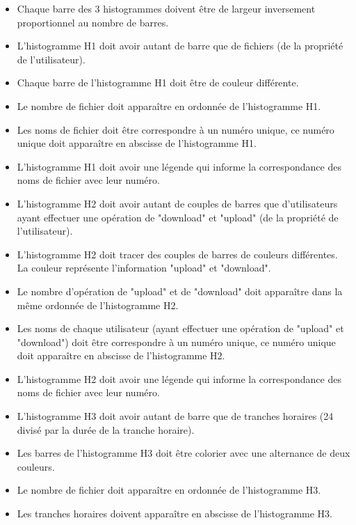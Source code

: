 \documentclass[10pt,a4paper]{report}
\begin{document}
\begin{itemize}[label = $\triangleright$]
\item Chaque barre des 3 histogrammes doivent être de largeur inversement proportionnel au nombre de barres.

\item L'histogramme H1 doit avoir autant de barre que de fichiers (de la propriété de l'utilisateur).

\item Chaque barre de l'histogramme H1 doit être de couleur différente.

\item Le nombre de fichier doit apparaître en ordonnée de l'histogramme H1.

\item Les noms de fichier doit être correspondre à un numéro unique, ce numéro unique doit apparaître en abscisse de l'histogramme H1.

\item L'histogramme H1 doit avoir une légende qui informe la correspondance des noms de fichier avec leur numéro.

\item L'histogramme H2 doit avoir autant de couples de barres que d'utilisateurs ayant effectuer une opération de "download" et "upload" (de la propriété de l'utilisateur).

\item L'histogramme H2 doit tracer des couples de barres de couleurs différentes. La couleur représente l'information "upload" et "download".

\item Le nombre d'opération de "upload" et de "download" doit apparaître dans la même ordonnée de l'histogramme H2.

\item Les noms de chaque utilisateur (ayant effectuer une opération de "upload" et "download") doit être correspondre à un numéro unique, ce numéro unique doit apparaître en abscisse de l'histogramme H2.

\item L'histogramme H2 doit avoir une légende qui informe la correspondance des noms de fichier avec leur numéro.

\item L'histogramme H3 doit avoir autant de barre que de tranches horaires (24 divisé par la durée de la tranche horaire).

\item Les barres de l'histogramme H3 doit être colorier avec une alternance de deux couleurs.

\item Le nombre de fichier doit apparaître en ordonnée de l'histogramme H3.

\item Les tranches horaires doivent apparaître en abscisse de l'histogramme H3.

\end{itemize}
\end{document}
